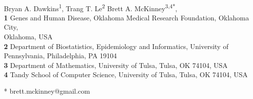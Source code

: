 \documentclass[10pt,letterpaper]{article}
\begin{document}
\vspace*{0.2in}


\begin{flushleft}
{\Large
\textbf{} %
}
\newline
\\
Bryan A. Dawkins\textsuperscript{1},
Trang T. Le\textsuperscript{2}
Brett A. McKinney\textsuperscript{3,4*},
\\
\bigskip
\textbf{1} Genes and Human Disease, Oklahoma Medical Research Foundation, Oklahoma City, \\
\hphantom{1} Oklahoma, USA
\\
\textbf{2} Department of Biostatistics, Epidemiology and Informatics, University of \\
\hphantom{2} Pennsylvania, Philadelphia, PA 19104
\\
\textbf{3} Department of Mathematics, University of Tulsa, Tulsa, OK 74104, USA
\\
\textbf{4} Tandy School of Computer Science, University of Tulsa, Tulsa, OK 74104, USA
\\
\bigskip

% 
%





* brett.mckinney@gmail.com

\end{flushleft}
\end{document}
